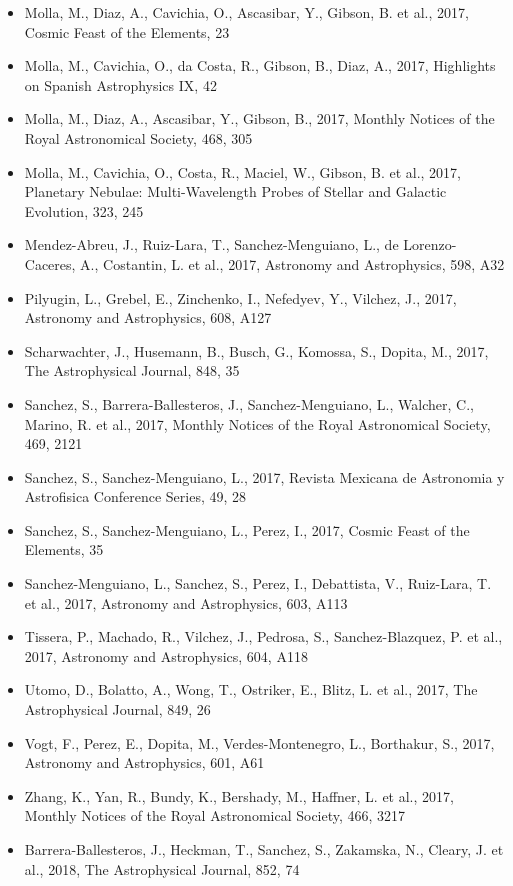 \documentclass{letter}
\begin{document}
\begin{enumerate}
\begin{itemize}
\item Molla, M., Diaz, A., Cavichia, O., Ascasibar, Y., Gibson, B. et al., 2017, Cosmic Feast of the Elements, 23
\item Molla, M., Cavichia, O., da Costa, R., Gibson, B., Diaz, A., 2017, Highlights on Spanish Astrophysics IX, 42
\item Molla, M., Diaz, A., Ascasibar, Y., Gibson, B., 2017, Monthly Notices of the Royal Astronomical Society, 468, 305
\item Molla, M., Cavichia, O., Costa, R., Maciel, W., Gibson, B. et al., 2017, Planetary Nebulae: Multi-Wavelength Probes of Stellar and Galactic Evolution, 323, 245
\item Mendez-Abreu, J., Ruiz-Lara, T., Sanchez-Menguiano, L., de Lorenzo-Caceres, A., Costantin, L. et al., 2017, Astronomy and Astrophysics, 598, A32
\item Pilyugin, L., Grebel, E., Zinchenko, I., Nefedyev, Y., Vilchez, J., 2017, Astronomy and Astrophysics, 608, A127
\item Scharwachter, J., Husemann, B., Busch, G., Komossa, S., Dopita, M., 2017, The Astrophysical Journal, 848, 35
\item Sanchez, S., Barrera-Ballesteros, J., Sanchez-Menguiano, L., Walcher, C., Marino, R. et al., 2017, Monthly Notices of the Royal Astronomical Society, 469, 2121
\item Sanchez, S., Sanchez-Menguiano, L., 2017, Revista Mexicana de Astronomia y Astrofisica Conference Series, 49, 28
\item Sanchez, S., Sanchez-Menguiano, L., Perez, I., 2017, Cosmic Feast of the Elements, 35
\item Sanchez-Menguiano, L., Sanchez, S., Perez, I., Debattista, V., Ruiz-Lara, T. et al., 2017, Astronomy and Astrophysics, 603, A113
\item Tissera, P., Machado, R., Vilchez, J., Pedrosa, S., Sanchez-Blazquez, P. et al., 2017, Astronomy and Astrophysics, 604, A118
\item Utomo, D., Bolatto, A., Wong, T., Ostriker, E., Blitz, L. et al., 2017, The Astrophysical Journal, 849, 26
\item Vogt, F., Perez, E., Dopita, M., Verdes-Montenegro, L., Borthakur, S., 2017, Astronomy and Astrophysics, 601, A61
\item Zhang, K., Yan, R., Bundy, K., Bershady, M., Haffner, L. et al., 2017, Monthly Notices of the Royal Astronomical Society, 466, 3217
\item Barrera-Ballesteros, J., Heckman, T., Sanchez, S., Zakamska, N., Cleary, J. et al., 2018, The Astrophysical Journal, 852, 74

\end{itemize}
\end{enumerate}
\end{document}
